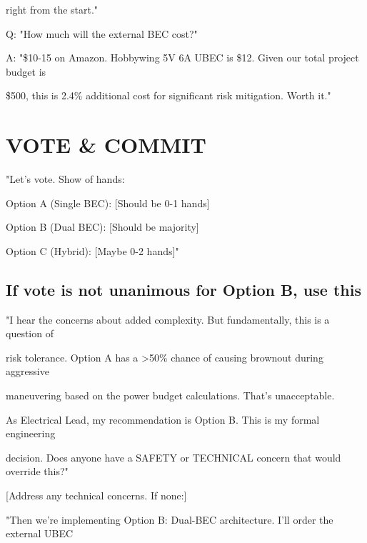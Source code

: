 \documentclass[11pt,letterpaper]{article}
\begin{document}
{right from the start."\par

Q: "How much will the external BEC cost?"\par

A: "\$10-15 on Amazon. Hobbywing 5V 6A UBEC is \$12. Given our total project budget is\par

\$500, this is 2.4\% additional cost for significant risk mitigation. Worth it."\par

\section{VOTE \& COMMIT}

"Let's vote. Show of hands:\par

Option A (Single BEC): [Should be 0-1 hands]\par

Option B (Dual BEC):   [Should be majority]\par

Option C (Hybrid):     [Maybe 0-2 hands]"\par

\subsection{If vote is not unanimous for Option B, use this}

"I hear the concerns about added complexity. But fundamentally, this is a question of\par

risk tolerance. Option A has a >50\% chance of causing brownout during aggressive\par

maneuvering based on the power budget calculations. That's unacceptable.\par

As Electrical Lead, my recommendation is Option B. This is my formal engineering\par

decision. Does anyone have a SAFETY or TECHNICAL concern that would override this?"\par

[Address any technical concerns. If none:]\par

"Then we're implementing Option B: Dual-BEC architecture. I'll order the external UBEC\par

}
\end{document}
